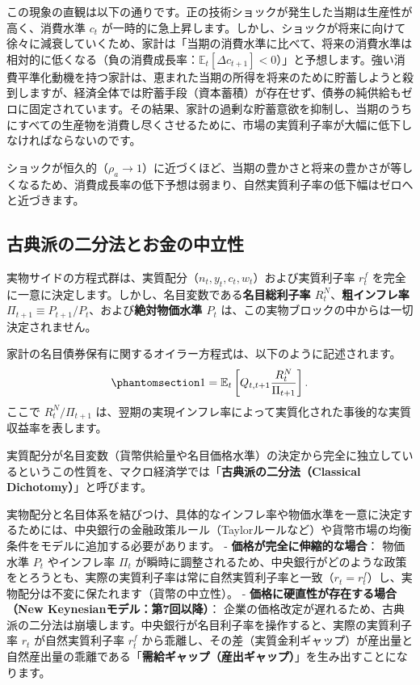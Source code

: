 \documentclass[
  japanese,
  lualatex,
  ja=standard,
  12pt,
  a4paper]{ltjsarticle}
\begin{document}
この現象の直観は以下の通りです。正の技術ショックが発生した当期は生産性が高く、消費水準
\(c_t\)
が一時的に急上昇します。しかし、ショックが将来に向けて徐々に減衰していくため、家計は「当期の消費水準に比べて、将来の消費水準は相対的に低くなる（負の消費成長率：\(\mathbb{E}_t[\Delta c_{t+1}] < 0\)）」と予想します。強い消費平準化動機を持つ家計は、恵まれた当期の所得を将来のために貯蓄しようと殺到しますが、経済全体では貯蓄手段（資本蓄積）が存在せず、債券の純供給もゼロに固定されています。その結果、家計の過剰な貯蓄意欲を抑制し、当期のうちにすべての生産物を消費し尽くさせるために、市場の実質利子率が大幅に低下しなければならないのです。

ショックが恒久的（\(\rho_a \to 1\)）に近づくほど、当期の豊かさと将来の豊かさが等しくなるため、消費成長率の低下予想は弱まり、自然実質利子率の低下幅はゼロへと近づきます。

\subsection{古典派の二分法とお金の中立性}\label{ux53e4ux5178ux6d3eux306eux4e8cux5206ux6cd5ux3068ux304aux91d1ux306eux4e2dux7acbux6027}

実物サイドの方程式群は、実質配分（\(n_t, y_t, c_t, w_t\)）および実質利子率
\(r_t^f\)
を完全に一意に決定します。しかし、名目変数である\textbf{名目総利子率
\(R_t^N\)}、\textbf{粗インフレ率
\(\Pi_{t+1} \equiv P_{t+1}/P_t\)}、および\textbf{絶対物価水準 \(P_t\)}
は、この実物ブロックの中からは一切決定されません。

家計の名目債券保有に関するオイラー方程式は、以下のように記述されます。
\begin{equation}\protect\phantomsection\label{eq-nominal-bond-euler}{
1 = \mathbb{E}_t \left[ Q_{t,t+1} \frac{R_t^N}{\Pi_{t+1}} \right].
}\end{equation} ここで \(R_t^N / \Pi_{t+1}\)
は、翌期の実現インフレ率によって実質化された事後的な実質収益率を表します。

実質配分が名目変数（貨幣供給量や名目価格水準）の決定から完全に独立しているというこの性質を、マクロ経済学では「\textbf{古典派の二分法（Classical
Dichotomy）}」と呼びます。

実物配分と名目体系を結びつけ、具体的なインフレ率や物価水準を一意に決定するためには、中央銀行の金融政策ルール（Taylorルールなど）や貨幣市場の均衡条件をモデルに追加する必要があります。
- \textbf{価格が完全に伸縮的な場合}： 物価水準 \(P_t\) やインフレ率
\(\Pi_t\)
が瞬時に調整されるため、中央銀行がどのような政策をとろうとも、実際の実質利子率は常に自然実質利子率と一致（\(r_t = r_t^f\)）し、実物配分は不変に保たれます（貨幣の中立性）。
- \textbf{価格に硬直性が存在する場合（New
Keynesianモデル：第7回以降）}：
企業の価格改定が遅れるため、古典派の二分法は崩壊します。中央銀行が名目利子率を操作すると、実際の実質利子率
\(r_t\) が自然実質利子率 \(r_t^f\)
から乖離し、その差（実質金利ギャップ）が産出量と自然産出量の乖離である「\textbf{需給ギャップ（産出ギャップ）}」を生み出すことになります。
\end{document}
